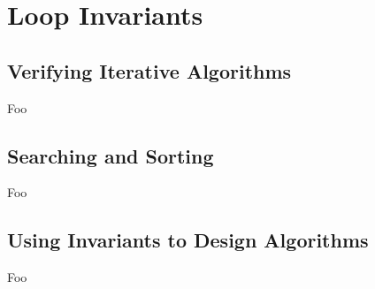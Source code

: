 \section{Loop Invariants}

\subsection{Verifying Iterative Algorithms}

Foo

\subsection{Searching and Sorting}

Foo

\subsection{Using Invariants to Design Algorithms}

Foo

